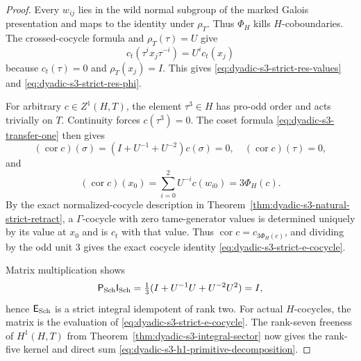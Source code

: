 \begin{proof}
Every $w_{ij}$ lies in
the wild normal subgroup
of the marked Galois
presentation and maps
to the identity under $\rho_T$.
Thus $\Phi_H$ kills
$H$-coboundaries.
The crossed-cocycle formula
and $\rho_T(\tau)=U$ give
\[
c_t(\tau^i x_j\tau^{-i})
=U^i c_t(x_j)
\]
because $c_t(\tau)=0$ and
$\rho_T(x_j)=I$.
This gives
\eqref{eq:dyadic-s3-strict-res-values}
and
\eqref{eq:dyadic-s3-strict-res-phi}.

For arbitrary $c\in Z^1(H,T)$,
the element $\tau^3\in H$
has pro-odd order and
acts trivially on $T$.
Continuity forces
$c(\tau^3)=0$.
The coset formula
\eqref{eq:dyadic-s3-transfer-one}
then gives
\[
(\operatorname{cor}c)(\sigma)
=(I+U^{-1}+U^{-2})c(\sigma)=0,
\quad
(\operatorname{cor}c)(\tau)=0,
\]
and
\[
(\operatorname{cor}c)(x_0)
=\sum_{i=0}^{2}U^{-i}c(w_{i0})
=3\Phi_H(c).
\]
By the exact normalized-cocycle
description in
Theorem~\ref{thm:dyadic-s3-natural-strict-retract},
a $\Gamma$-cocycle with
zero tame-generator values
is determined uniquely by
its value at $x_0$ and
is $c_t$ with that value.
Thus $\operatorname{cor}c
=c_{3\Phi_H(c)}$,
and dividing by the odd
unit $3$ gives the exact
cocycle identity
\eqref{eq:dyadic-s3-strict-e-cocycle}.

Matrix multiplication shows
\[
\mathsf P_{\rm Sch}
\mathsf I_{\rm Sch}
=\tfrac13(I+U^{-1}U+U^{-2}U^2)
=I,
\]
hence $\mathsf E_{\rm Sch}$
is a strict integral
idempotent of rank two.
For actual $H$-cocycles,
the matrix is the evaluation
of \eqref{eq:dyadic-s3-strict-e-cocycle}.
The rank-seven freeness of
$H^1(H,T)$ from
Theorem~\ref{thm:dyadic-s3-integral-sector}
now gives the rank-five kernel
and direct sum
\eqref{eq:dyadic-s3-h1-primitive-decomposition}.
\end{proof}

